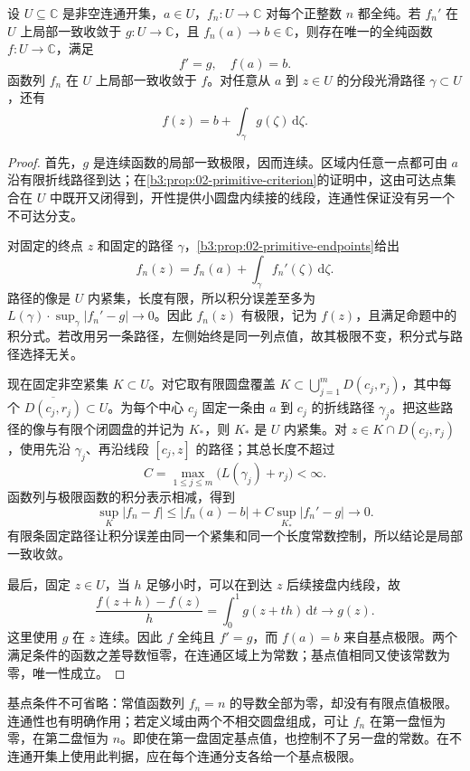 \begin{proposition}[导数收敛与基点归一化]\label{b3:prop:04-primitive-convergence}
设 \(U\subseteq\mathbb C\) 是非空连通开集，\(a\in U\)，\(f_n:U\to\mathbb C\) 对每个正整数 \(n\) 都全纯。若 \(f_n'\) 在 \(U\) 上局部一致收敛于 \(g:U\to\mathbb C\)，且 \(f_n(a)\to b\in\mathbb C\)，则存在唯一的全纯函数 \(f:U\to\mathbb C\)，满足
\[
 f'=g,\quad f(a)=b.
\]
函数列 \(f_n\) 在 \(U\) 上局部一致收敛于 \(f\)。对任意从 \(a\) 到 \(z\in U\) 的分段光滑路径 \(\gamma\subset U\)，还有
\[
 f(z)=b+\int_\gamma g(\zeta)\,\mathrm{d}\zeta.
\]
\end{proposition}
\begin{proof}
首先，\(g\) 是连续函数的局部一致极限，因而连续。区域内任意一点都可由 \(a\) 沿有限折线路径到达；在\cref{b3:prop:02-primitive-criterion}的证明中，这由可达点集合在 \(U\) 中既开又闭得到，开性提供小圆盘内续接的线段，连通性保证没有另一个不可达分支。

对固定的终点 \(z\) 和固定的路径 \(\gamma\)，\cref{b3:prop:02-primitive-endpoints}给出
\[
 f_n(z)=f_n(a)+\int_\gamma f_n'(\zeta)\,\mathrm{d}\zeta.
\]
路径的像是 \(U\) 内紧集，长度有限，所以积分误差至多为
\(L(\gamma)\cdot\sup_\gamma|f_n'-g|\to0\)。因此 \(f_n(z)\) 有极限，记为 \(f(z)\)，且满足命题中的积分式。若改用另一条路径，左侧始终是同一列点值，故其极限不变，积分式与路径选择无关。

现在固定非空紧集 \(K\subset U\)。对它取有限圆盘覆盖
\(K\subset\bigcup_{j=1}^mD(c_j,r_j)\)，其中每个 \(\overline{D(c_j,r_j)}\subset U\)。为每个中心 \(c_j\) 固定一条由 \(a\) 到 \(c_j\) 的折线路径 \(\gamma_j\)。把这些路径的像与有限个闭圆盘的并记为 \(K_*\)，则 \(K_*\) 是 \(U\) 内紧集。对 \(z\in K\cap D(c_j,r_j)\)，使用先沿 \(\gamma_j\)、再沿线段 \([c_j,z]\) 的路径；其总长度不超过
\[
 C=\max_{1\le j\le m}\bigl(L(\gamma_j)+r_j\bigr)<\infty.
\]
函数列与极限函数的积分表示相减，得到
\[
 \sup_K|f_n-f|
 \le |f_n(a)-b|+C\sup_{K_*}|f_n'-g|\longrightarrow0.
\]
有限条固定路径让积分误差由同一个紧集和同一个长度常数控制，所以结论是局部一致收敛。

最后，固定 \(z\in U\)，当 \(h\) 足够小时，可以在到达 \(z\) 后续接盘内线段，故
\[
 \frac{f(z+h)-f(z)}h
 =\int_0^1g(z+th)\,\mathrm{d}t\longrightarrow g(z).
\]
这里使用 \(g\) 在 \(z\) 连续。因此 \(f\) 全纯且 \(f'=g\)，而 \(f(a)=b\) 来自基点极限。两个满足条件的函数之差导数恒零，在连通区域上为常数；基点值相同又使该常数为零，唯一性成立。
\end{proof}

\ProseParagraphBreak

基点条件不可省略：常值函数列 \(f_n=n\) 的导数全部为零，却没有有限点值极限。连通性也有明确作用；若定义域由两个不相交圆盘组成，可让 \(f_n\) 在第一盘恒为零，在第二盘恒为 \(n\)。即使在第一盘固定基点值，也控制不了另一盘的常数。在不连通开集上使用此判据，应在每个连通分支各给一个基点极限。


